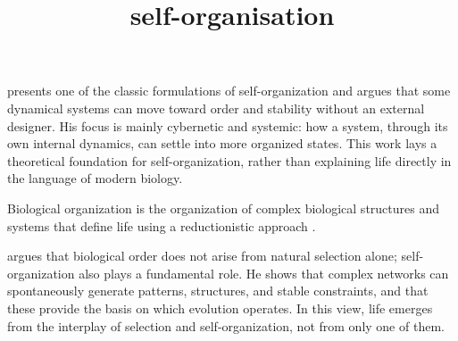 \documentclass[a4paper]{article}
\title{self-organisation}
\date{}
\begin{document}
    \maketitle
    \cite{ashby-1947-principles-of-the-self-organizing-dynamic-system} presents one of the classic formulations of self-organization and argues that some dynamical systems can move toward order and stability without an external designer.
    His focus is mainly cybernetic and systemic: how a system, through its own internal dynamics, can settle into more organized states.
    This work lays a theoretical foundation for self-organization, rather than explaining life directly in the language of modern biology.
    
    Biological organization is the organization of complex biological structures and systems that define life using a reductionistic approach .
    
    
    
    \cite{kauffman-1993-the-origins-of-order-self-organization-and-selection-in-evolution} argues that biological order does not arise from natural selection alone; self-organization also plays a fundamental role.
    He shows that complex networks can spontaneously generate patterns, structures, and stable constraints, and that these provide the basis on which evolution operates.
    In this view, life emerges from the interplay of selection and self-organization, not from only one of them.
    
    
    
    
    
    
\end{document}
